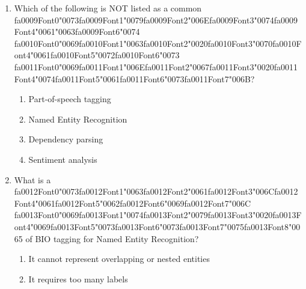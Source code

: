 \documentclass[12pt]{article}
\begin{document}
\begin{enumerate}[label=Q\arabic*.]
\begin{enumerate}[label=(\Alph*)]
    \item It cannot tokenize English at all
    \item It ignores punctuation entirely
\end{enumerate}
\item Which of the following is NOT listed as a common {\csname fa0009Font0\endcsname\char"0073}{\csname fa0009Font1\endcsname\char"0079}{\csname fa0009Font2\endcsname\char"006E}{\csname fa0009Font3\endcsname\char"0074}{\csname fa0009Font4\endcsname\char"0061}{\char"0063}{\csname fa0009Font6\endcsname\char"0074} {\csname fa0010Font0\endcsname\char"0069}{\csname fa0010Font1\endcsname\char"0063}{\csname fa0010Font2\endcsname\char"0020}{\csname fa0010Font3\endcsname\char"0070}{\csname fa0010Font4\endcsname\char"0061}{\csname fa0010Font5\endcsname\char"0072}{\csname fa0010Font6\endcsname\char"0073} {\csname fa0011Font0\endcsname\char"0069}{\csname fa0011Font1\endcsname\char"006E}{\csname fa0011Font2\endcsname\char"0067}{\csname fa0011Font3\endcsname\char"0020}{\csname fa0011Font4\endcsname\char"0074}{\csname fa0011Font5\endcsname\char"0061}{\csname fa0011Font6\endcsname\char"0073}{\csname fa0011Font7\endcsname\char"006B}?
\begin{enumerate}[label=(\Alph*)]
    \item Part-of-speech tagging
    \item Named Entity Recognition
    \item Dependency parsing
    \item Sentiment analysis
\end{enumerate}
\item What is a {\csname fa0012Font0\endcsname\char"0073}{\csname fa0012Font1\endcsname\char"0063}{\csname fa0012Font2\endcsname\char"0061}{\csname fa0012Font3\endcsname\char"006C}{\csname fa0012Font4\endcsname\char"0061}{\csname fa0012Font5\endcsname\char"0062}{\csname fa0012Font6\endcsname\char"0069}{\csname fa0012Font7\endcsname\char"006C} {\csname fa0013Font0\endcsname\char"0069}{\csname fa0013Font1\endcsname\char"0074}{\csname fa0013Font2\endcsname\char"0079}{\csname fa0013Font3\endcsname\char"0020}{\csname fa0013Font4\endcsname\char"0069}{\csname fa0013Font5\endcsname\char"0073}{\csname fa0013Font6\endcsname\char"0073}{\csname fa0013Font7\endcsname\char"0075}{\csname fa0013Font8\endcsname\char"0065} of BIO tagging for Named Entity Recognition?
\begin{enumerate}[label=(\Alph*)]
    \item It cannot represent overlapping or nested entities
    \item It requires too many labels

\end{enumerate}
\end{enumerate}
\end{document}

